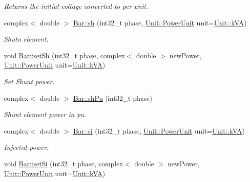 \begin{DoxyCompactItemize}
\begin{DoxyCompactList}\small\item\em Returns the initial voltage converted to per unit. \end{DoxyCompactList}\item 
complex$<$ double $>$ \hyperlink{group___models_gac188071bf5f165b0acdaa4c8af82355c}{Bar\+::sh} (int32\+\_\+t phase, \hyperlink{class_unit_ace265ae255370ccacfd5370337572c3b}{Unit\+::\+Power\+Unit} unit=\hyperlink{class_unit_ace265ae255370ccacfd5370337572c3ba72b181a842ae2759488a2fa1410d3696}{Unit\+::k\+V\+A})
\begin{DoxyCompactList}\small\item\em Shutn element. \end{DoxyCompactList}\item 
void \hyperlink{group___models_ga207abd3d0649a488e3c44cf2a501ed23}{Bar\+::set\+Sh} (int32\+\_\+t phase, complex$<$ double $>$ new\+Power, \hyperlink{class_unit_ace265ae255370ccacfd5370337572c3b}{Unit\+::\+Power\+Unit} unit=\hyperlink{class_unit_ace265ae255370ccacfd5370337572c3ba72b181a842ae2759488a2fa1410d3696}{Unit\+::k\+V\+A})
\begin{DoxyCompactList}\small\item\em Set Shunt power. \end{DoxyCompactList}\item 
complex$<$ double $>$ \hyperlink{group___models_ga7df2ed5705f06c0cf2937d25102ca847}{Bar\+::sh\+Pu} (int32\+\_\+t phase)
\begin{DoxyCompactList}\small\item\em Shunt element power in pu. \end{DoxyCompactList}\item 
complex$<$ double $>$ \hyperlink{group___models_ga02bbc279f1e133f66b12ee21e7bebcd8}{Bar\+::si} (int32\+\_\+t phase, \hyperlink{class_unit_ace265ae255370ccacfd5370337572c3b}{Unit\+::\+Power\+Unit} unit=\hyperlink{class_unit_ace265ae255370ccacfd5370337572c3ba72b181a842ae2759488a2fa1410d3696}{Unit\+::k\+V\+A})
\begin{DoxyCompactList}\small\item\em Injected power. \end{DoxyCompactList}\item 
void \hyperlink{group___models_ga74e510be49e50e4c14550b32e1dc92f9}{Bar\+::set\+Si} (int32\+\_\+t phase, complex$<$ double $>$ new\+Power, \hyperlink{class_unit_ace265ae255370ccacfd5370337572c3b}{Unit\+::\+Power\+Unit} unit=\hyperlink{class_unit_ace265ae255370ccacfd5370337572c3ba72b181a842ae2759488a2fa1410d3696}{Unit\+::k\+V\+A})

\end{DoxyCompactItemize}
